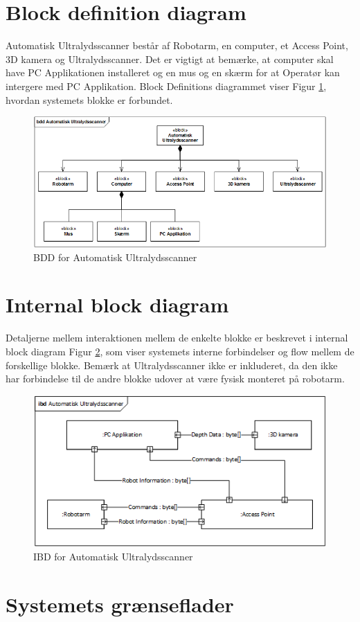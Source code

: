 \section{Block definition diagram}
Automatisk Ultralydsscanner består af Robotarm, en computer, et Access Point, 3D kamera og Ultralydsscanner. Det er vigtigt at bemærke, at computer skal have PC Applikationen installeret og en mus og en skærm for at Operatør kan intergere med PC Applikation. Block Definitions diagrammet viser Figur \ref{BDD}, hvordan systemets blokke er forbundet. 

\begin{figure}[H]
    \centering
    \includegraphics[width=1\textwidth]{figurer/d/Design/BDD}
    \caption{BDD for Automatisk Ultralydsscanner}
    \label{BDD}
\end{figure}

\section{Internal block diagram}
Detaljerne mellem interaktionen mellem de enkelte blokke er beskrevet i internal block diagram Figur \ref{IBD}, som viser systemets interne forbindelser og flow mellem de forskellige blokke. Bemærk at Ultralydsscanner ikke er inkluderet, da den ikke har forbindelse til de andre blokke udover at være fysisk monteret på robotarm. 

\begin{figure}[H]
    \centering
    \includegraphics[width=1\textwidth]{figurer/d/Design/IBD}
    \caption{IBD for Automatisk Ultralydsscanner}
    \label{IBD}
\end{figure}

\section{Systemets grænseflader}